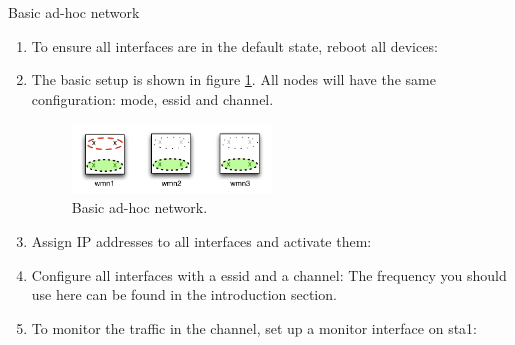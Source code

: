 \begin{exercise}{Basic ad-hoc network}

\begin{enumerate}
	\item To ensure all interfaces are in the default state, reboot all devices:\newline
	\item  The basic setup is shown in figure \ref{fig:ad-hoc1}. All nodes will have the same configuration: mode, \ac{essid} and channel.\newline
	\begin{figure}
		\begin{center}
			\includegraphics[width=0.5\textwidth]{images/adhoc1.pdf} 
			\caption{Basic ad-hoc network.}
			\label{fig:ad-hoc1} 
		\end{center}
	\end{figure}
	\item Assign IP addresses to all interfaces and activate them:\newline
	\item Configure all interfaces with a \ac{essid} and a channel:\newline
	\remark The frequency you should use here can be found in the introduction section.\newline
	\item To monitor the traffic in the channel, set up a monitor interface on \ac{sta}1:\newline

\end{enumerate}
\end{exercise}
